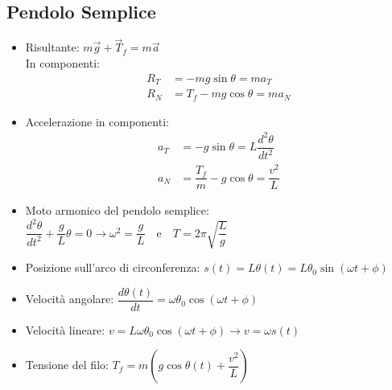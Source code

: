 \documentclass[10pt,a4paper]{article}
\newcommand{\deriv}[2][t]{\dfrac{d{#2}}{d{#1}}}
\newcommand{\derivtwo}[2][t]{\dfrac{d^2{#2}}{d{#1}^2}}
\begin{document}
	\subsection{Pendolo Semplice}
	\begin{itemize}
	\item Risultante: \( m\vec{g} + \vec{T}_f = m\vec{a} \) \\
	In componenti: 
		\begin{align*}
		R_T &= -mg\sin\theta = ma_T \\
		R_N &= T_f-mg\cos\theta = ma_N
		\end{align*}
	\item Accelerazione in componenti:
		\begin{align*}
		a_T &= -g\sin\theta = L\derivtwo{\theta} \\
		a_N &= \dfrac{T_f}{m} - g\cos\theta = \dfrac{v^2}{L}
		\end{align*}
	\item Moto armonico del pendolo semplice: \( \derivtwo{\theta} + \dfrac{g}{L}\theta  = 0 \rightarrow \omega^2 = \dfrac{g}{L} \quad \text{e} \quad T = \displaystyle2\pi\sqrt{\dfrac{L}{g}} \)
	\item Posizione sull'arco di circonferenza: \( s(t) = L\theta(t) = L\theta_0\sin(\omega t+\phi) \)
	\item Velocità angolare: \( \deriv{\theta(t)} = \omega\theta_0\cos(\omega t+\phi) \)
	\item Velocità lineare: \( v = L\omega\theta_0\cos(\omega t+\phi) \rightarrow v = \omega s(t) \) 
	\item Tensione del filo: \( T_f = m\left(g\cos\theta(t) + \dfrac{v^2}{L}\right) \)
	\end{itemize}

	\vspace{5mm}
\end{document}
